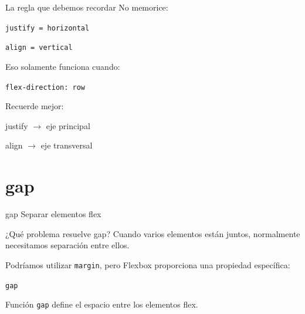 \documentclass[aspectratio=169,11.5pt]{beamer}
\begin{document}
    \begin{frame}{La regla que debemos recordar}
        No memorice:

        \begin{center}
            \texttt{justify = horizontal}

            \texttt{align = vertical}
        \end{center}

        Eso solamente funciona cuando:

        \begin{center}
            \texttt{flex-direction: row}
        \end{center}

        Recuerde mejor:

        \begin{center}
            \Large
            justify $\rightarrow$ eje principal

            align $\rightarrow$ eje transversal
        \end{center}
    \end{frame}



    \section{gap}

    \SectionSlide
    {gap}
    {Separar elementos flex}

    \begin{frame}{¿Qué problema resuelve gap?}
        Cuando varios elementos están juntos,
        normalmente necesitamos separación entre ellos.

        Podríamos utilizar \texttt{margin},
        pero Flexbox proporciona una propiedad específica:

        \begin{center}
            \Large
            \texttt{gap}
        \end{center}

        \begin{block}{Función}
            \texttt{gap} define el espacio
            entre los elementos flex.
        \end{block}
    \end{frame}
\end{document}
